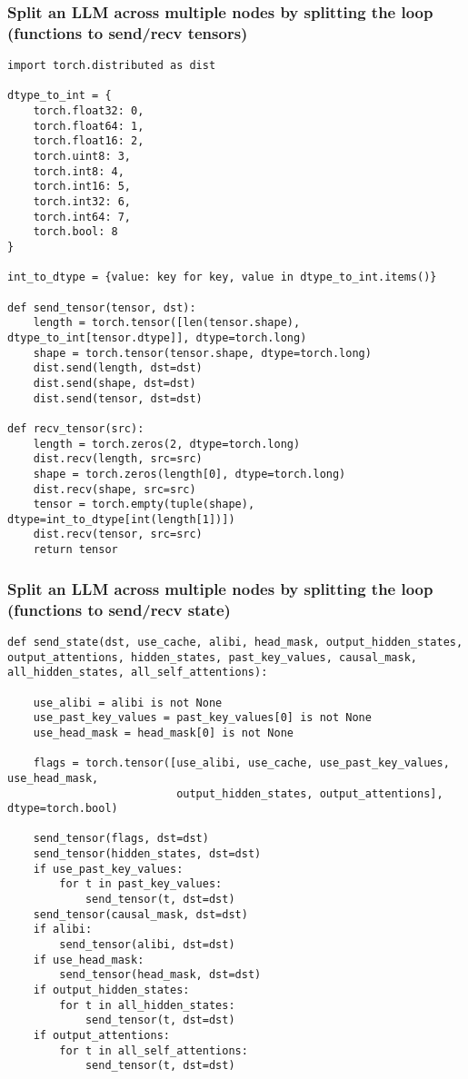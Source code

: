 \documentclass{beamer}
\begin{document}
\begin{frame}[fragile]
\frametitle{Split an LLM across multiple nodes by splitting the loop (functions to send/recv tensors)}
\tiny\begin{verbatim}
import torch.distributed as dist

dtype_to_int = {
    torch.float32: 0,
    torch.float64: 1,
    torch.float16: 2,
    torch.uint8: 3,
    torch.int8: 4,
    torch.int16: 5,
    torch.int32: 6,
    torch.int64: 7,
    torch.bool: 8
}

int_to_dtype = {value: key for key, value in dtype_to_int.items()}

def send_tensor(tensor, dst):
    length = torch.tensor([len(tensor.shape), dtype_to_int[tensor.dtype]], dtype=torch.long)
    shape = torch.tensor(tensor.shape, dtype=torch.long)
    dist.send(length, dst=dst)
    dist.send(shape, dst=dst)
    dist.send(tensor, dst=dst)

def recv_tensor(src):
    length = torch.zeros(2, dtype=torch.long)
    dist.recv(length, src=src)
    shape = torch.zeros(length[0], dtype=torch.long)
    dist.recv(shape, src=src)
    tensor = torch.empty(tuple(shape), dtype=int_to_dtype[int(length[1])])
    dist.recv(tensor, src=src)
    return tensor

\end{verbatim}
\end{frame}

\begin{frame}[fragile]
\frametitle{Split an LLM across multiple nodes by splitting the loop (functions to send/recv state)}
\tiny\begin{verbatim}
def send_state(dst, use_cache, alibi, head_mask, output_hidden_states, output_attentions, hidden_states, past_key_values, causal_mask, all_hidden_states, all_self_attentions):

    use_alibi = alibi is not None
    use_past_key_values = past_key_values[0] is not None
    use_head_mask = head_mask[0] is not None

    flags = torch.tensor([use_alibi, use_cache, use_past_key_values, use_head_mask,
                          output_hidden_states, output_attentions], dtype=torch.bool)

    send_tensor(flags, dst=dst)
    send_tensor(hidden_states, dst=dst)
    if use_past_key_values:
        for t in past_key_values:
            send_tensor(t, dst=dst)
    send_tensor(causal_mask, dst=dst)
    if alibi:
        send_tensor(alibi, dst=dst)
    if use_head_mask:
        send_tensor(head_mask, dst=dst)
    if output_hidden_states:
        for t in all_hidden_states:
            send_tensor(t, dst=dst)
    if output_attentions:
        for t in all_self_attentions:
            send_tensor(t, dst=dst)
\end{verbatim}
\end{frame}
\end{document}
